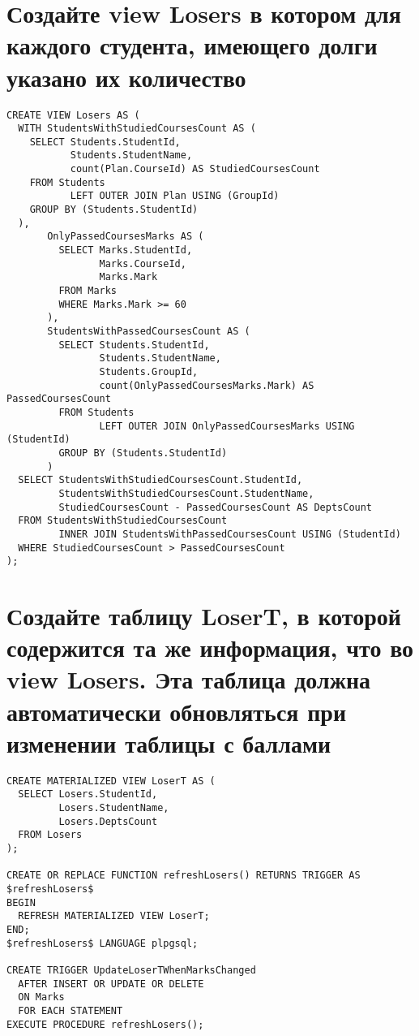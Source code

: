 \documentclass{article}
\begin{document}
\section{Создайте view Losers в котором для каждого студента, имеющего долги указано их количество}
\begin{verbatim}
CREATE VIEW Losers AS (
  WITH StudentsWithStudiedCoursesCount AS (
    SELECT Students.StudentId,
           Students.StudentName,
           count(Plan.CourseId) AS StudiedCoursesCount
    FROM Students
           LEFT OUTER JOIN Plan USING (GroupId)
    GROUP BY (Students.StudentId)
  ),
       OnlyPassedCoursesMarks AS (
         SELECT Marks.StudentId,
                Marks.CourseId,
                Marks.Mark
         FROM Marks
         WHERE Marks.Mark >= 60
       ),
       StudentsWithPassedCoursesCount AS (
         SELECT Students.StudentId,
                Students.StudentName,
                Students.GroupId,
                count(OnlyPassedCoursesMarks.Mark) AS PassedCoursesCount
         FROM Students
                LEFT OUTER JOIN OnlyPassedCoursesMarks USING (StudentId)
         GROUP BY (Students.StudentId)
       )
  SELECT StudentsWithStudiedCoursesCount.StudentId,
         StudentsWithStudiedCoursesCount.StudentName,
         StudiedCoursesCount - PassedCoursesCount AS DeptsCount
  FROM StudentsWithStudiedCoursesCount
         INNER JOIN StudentsWithPassedCoursesCount USING (StudentId)
  WHERE StudiedCoursesCount > PassedCoursesCount
);
\end{verbatim}

\section{Создайте таблицу LoserT, в которой содержится та же информация, что во view Losers. Эта таблица должна автоматически обновляться при изменении таблицы с баллами}

\begin{verbatim}
CREATE MATERIALIZED VIEW LoserT AS (
  SELECT Losers.StudentId,
         Losers.StudentName,
         Losers.DeptsCount
  FROM Losers
);

CREATE OR REPLACE FUNCTION refreshLosers() RETURNS TRIGGER AS
$refreshLosers$
BEGIN
  REFRESH MATERIALIZED VIEW LoserT;
END;
$refreshLosers$ LANGUAGE plpgsql;

CREATE TRIGGER UpdateLoserTWhenMarksChanged
  AFTER INSERT OR UPDATE OR DELETE
  ON Marks
  FOR EACH STATEMENT
EXECUTE PROCEDURE refreshLosers();
\end{verbatim}
\end{document}
